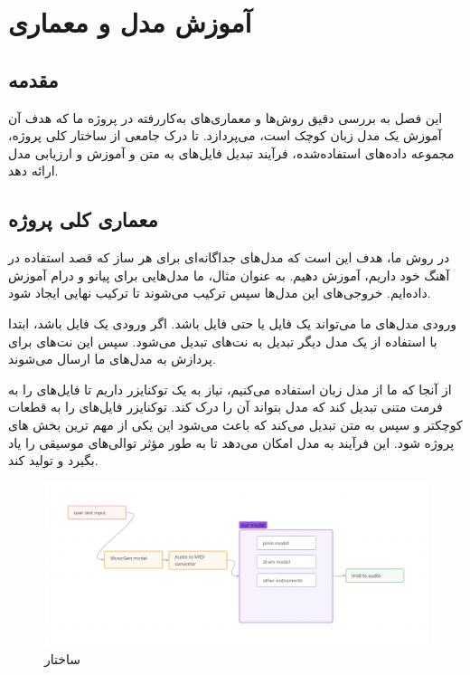 
\chapter{آموزش مدل و معماری}
\section{مقدمه}
این فصل به بررسی دقیق روش‌ها و معماری‌های به‌کاررفته در پروژه ما که هدف آن آموزش یک مدل زبان کوچک است، می‌پردازد. تا درک جامعی از ساختار کلی پروژه، مجموعه داده‌های استفاده‌شده، فرآیند تبدیل فایل‌های  به متن و آموزش و ارزیابی مدل ارائه دهد.

\section{معماری کلی پروژه}
در روش ما، هدف این است که مدل‌های جداگانه‌ای برای هر ساز که قصد استفاده در آهنگ خود داریم، آموزش دهیم. به عنوان مثال، ما مدل‌هایی برای پیانو و درام آموزش داده‌ایم. خروجی‌های این مدل‌ها سپس ترکیب می‌شوند تا ترکیب نهایی ایجاد شود.

ورودی مدل‌های ما می‌تواند یک فایل  یا حتی فایل  باشد. اگر ورودی یک فایل  باشد، ابتدا با استفاده از یک مدل دیگر تبدیل به نت‌های  تبدیل می‌شود. سپس این نت‌های  برای پردازش به مدل‌های ما ارسال می‌شوند.

از آنجا که ما از مدل زبان  استفاده می‌کنیم، نیاز به یک  توکنایزر  داریم تا فایل‌های  را به فرمت متنی تبدیل کند که مدل بتواند آن را درک کند. توکنایزر فایل‌های  را به قطعات کوچکتر و سپس به متن تبدیل می‌کند که باعث می‌شود این یکی از مهم ترین بخش های پروژه شود. این فرآیند به مدل امکان می‌دهد تا به طور مؤثر توالی‌های موسیقی را یاد بگیرد و تولید کند.

\begin{figure}[!htb]
      \centering
      \includegraphics[scale=0.3]{Figures/pipe.png}
      \caption{ساختار  
      }
      \label{Fig:Pipe}
\end{figure}


